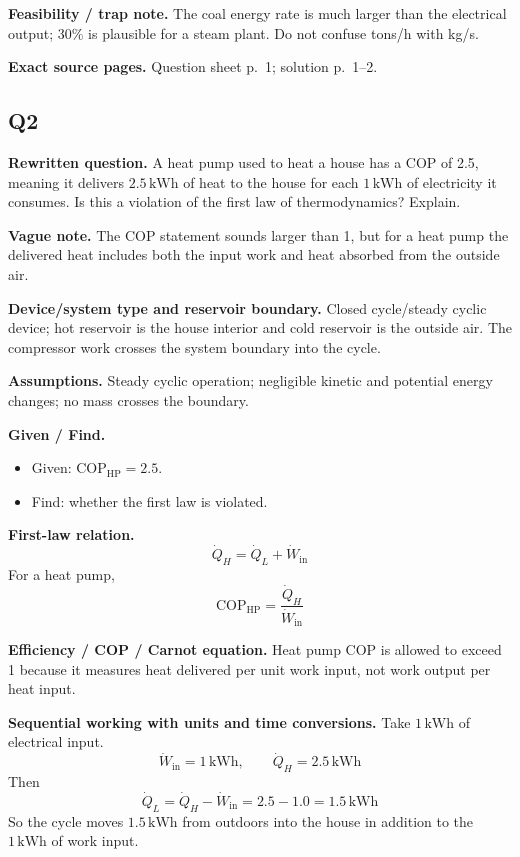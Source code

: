 \textbf{Feasibility / trap note.} The coal energy rate is much larger than the electrical output; 30\% is plausible for a steam plant. Do not confuse tons/h with kg/s.

\textbf{Exact source pages.} Question sheet p.~1; solution p.~1--2.

\subsection*{Q2}
\textbf{Rewritten question.} A heat pump used to heat a house has a COP of 2.5, meaning it delivers $2.5\,\text{kWh}$ of heat to the house for each $1\,\text{kWh}$ of electricity it consumes. Is this a violation of the first law of thermodynamics? Explain.

\textbf{Vague note.} The COP statement sounds larger than 1, but for a heat pump the delivered heat includes both the input work and heat absorbed from the outside air.

\textbf{Device/system type and reservoir boundary.} Closed cycle/steady cyclic device; hot reservoir is the house interior and cold reservoir is the outside air. The compressor work crosses the system boundary into the cycle.

\textbf{Assumptions.} Steady cyclic operation; negligible kinetic and potential energy changes; no mass crosses the boundary.

\textbf{Given / Find.}
\begin{itemize}
  \item Given: $\mathrm{COP}_{\mathrm{HP}}=2.5$.
  \item Find: whether the first law is violated.
\end{itemize}

\textbf{First-law relation.}
\[
\dot Q_H = \dot Q_L + \dot W_{\text{in}}
\]
For a heat pump,
\[
\mathrm{COP}_{\mathrm{HP}} = \frac{\dot Q_H}{\dot W_{\text{in}}}
\]

\textbf{Efficiency / COP / Carnot equation.} Heat pump COP is allowed to exceed 1 because it measures heat delivered per unit work input, not work output per heat input.

\textbf{Sequential working with units and time conversions.} Take $1\,\text{kWh}$ of electrical input.
\[
\dot W_{\text{in}} = 1\,\text{kWh}, \qquad \dot Q_H = 2.5\,\text{kWh}
\]
Then
\[
\dot Q_L = \dot Q_H - \dot W_{\text{in}} = 2.5 - 1.0 = 1.5\,\text{kWh}
\]
So the cycle moves $1.5\,\text{kWh}$ from outdoors into the house in addition to the $1\,\text{kWh}$ of work input.

